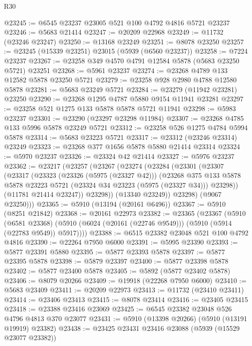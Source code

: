 \begin{lexlean}{R30}
\begin{coremodule}
@23245 := @6545 @23237 @23005 @521 @100 @4792 @4816 @5721 @23237
@23246 := @5683 @21414
@23247 := @20209 @22968
@23249 := @11732 (@23246 @23247)
@23250 := @13168 @23249
@23251 := @8078 @23250
@23257 := @23245 (@15339 @23251) @23015 (@5939 (@6560 @23237))
@23258 := @7224 @23237
@23267 := @23258 @349 @4570 @4791 @12584 @5878 (@5683 @23250 @5721) @23251
@23268 := @5961 @23237
@23274 := @23268 @4789 @133 @12582 @5878 @23250 @5721
@23279 := @23258 @928 @2980 @4788 @12580 @5878
@23281 := @5683 @23249 @5721
@23284 := @23279 (@11942 @23281) @23250
@23290 := @23268 @1295 @4787 @5880 @9154 @11941 @23281
@23297 := @23258 @521 @1275 @133 @5878 @5878 @5721 @11941
@23298 := @5983 @23237
@23301 := @23290 (@23297 @23298 @11984)
@23307 := @23268 @4785 @133 @5996 @5878 @23249 @5721
@23312 := @23258 @526 @1275 @4784 @5994 @5878
@23314 := @5683 @23223 @5721
@23317 := @23312 (@23246 @23314) @23249
@23323 := @23268 @377 @1656 @5878 @5880 @21414 @23314
@23324 := @5970 @23237
@23326 := @23324 @42 @21414
@23327 := @5976 @23237
@23362 := @23217
    (@23257
      (@23267
        (@23274
          (@23284
            (@23301
              (@23307
                (@23317
                  (@23323
                    (@23326 (@5975 (@23327 @42)))
                    (@23268
                      @375
                      @133
                      @5878
                      @5878
                      @23223
                      @5721
                      (@23324 @34 @23223 (@5975 (@23327 @34)))
                      @23298))
                  (@11781 @21414 @23247))
                @23298))
            (@13340 @23249))
          @23298)
        (@9067 @23250)))
@23365 := @5910 (@13194 (@20161 @6496))
@23367 := @5910 (@8251 @21842)
@23368 := @20161 @22973
@23382 := @23365
    (@23367
      (@5910
        (@6581 @23368)
        (@5910 (@6024 (@20161 (@22746 @9549))) (@5910 (@5914 (@22783 @9549)) @5917))))
@23388 := @6515 @23382 @23048 @521 @100 @4792 @4816
@23390 := @22264 @7950 @6000
@23391 := @5995 @23390
@23393 := @5877 @23391 @5880
@23395 := @5877 @23393 @5878
@23397 := @5877 @23395 @5878
@23398 := @5879 @23397
@23400 := @5877 @23398 @5878
@23402 := @5877 @23400 @5878
@23405 := @5892 (@5877 @23402 @5878)
@23406 := @8079 @20266
@23409 := @19918 (@22268 @7950 @6000)
@23410 := @5683 @23409
@23411 := @20209 @22973
@23413 := @11732 (@23410 @23411)
@23414 := @23406 @23413
@23415 := @8078 @23414
@23416 := @23405 @23415
@23418 := @23388 @23416 @23069
@23425 := @6545 @23382 @23048 @526 @4796 @4813 @370 @23077
@23431 := @5910 (@13398 @20266) (@5910 (@13191 @19919) @23382)
@23438 := @23425 @23431 @23416 @23088 (@5939 (@15529 @23077 @23382))

\end{coremodule}
\end{lexlean}
